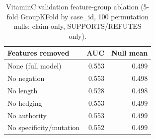 \begin{table}[t]
\centering
\caption{VitaminC validation feature-group ablation (5-fold GroupKFold by case_id, 100 permutation nulls; claim-only, SUPPORTS/REFUTES only).}
\label{tab:vitaminc_ablation}
\begin{tabular}{lrr}
\toprule
Features removed & AUC & Null mean \\
\midrule
None (full model) & 0.553 & 0.499 \\
No negation & 0.553 & 0.498 \\
No length & 0.528 & 0.498 \\
No hedging & 0.553 & 0.499 \\
No authority & 0.553 & 0.499 \\
No specificity/mutation & 0.552 & 0.499 \\
\bottomrule
\end{tabular}
\end{table}
